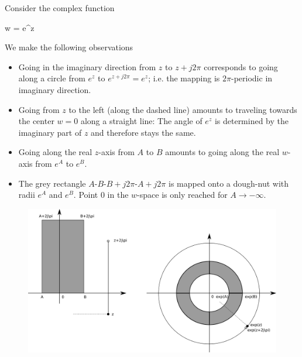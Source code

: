 

Consider the complex function

\bee
w = e^z
\eee

We make the following observations

\begin{itemize}
	
	\item Going in the imaginary direction from $z$ to $z+j2\pi$ corresponds to going along a circle from $e^z$ to $e^{z+j2\pi} = e^z$; i.e. the mapping is $2\pi$-periodic in imaginary direction.

	\item Going from $z$ to the left (along the dashed line) amounts to traveling towards the center $w=0$ along a straight line: The angle of $e^z$ is determined by the imaginary part of $z$ and therefore stays the same.

	\item Going along the real $z$-axis from $A$ to $B$ amounts to going along the real $w$-axis from $e^A$ to $e^B$.

	\item The grey rectangle $A$-$B$-$B+j2\pi$-$A+j2\pi$ is mapped onto a dough-nut with radii $e^A$ and $e^B$. Point $0$ in the $w$-space is only reached for $A \rightarrow -\infty$.
	
\end{itemize}



\begin{figure}[H]
	\includegraphics[scale=0.8]{images/complex_mappings_exp.png}
\end{figure}







